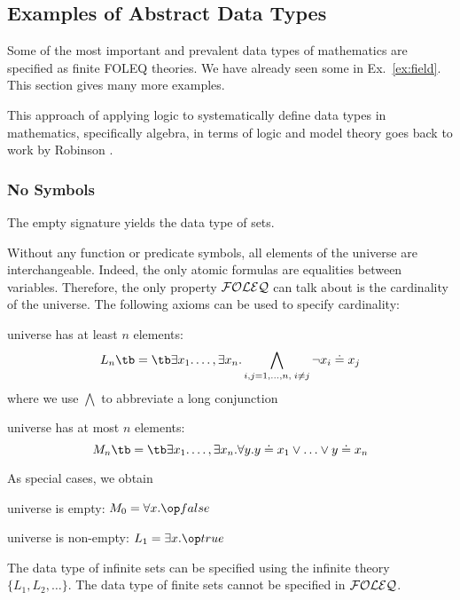 \subsection{Examples of Abstract Data Types}\label{sec:fol:adtexamples}

Some of the most important and prevalent data types of mathematics are specified as finite FOLEQ theories.
We have already seen some in Ex.~\ref{ex:field}.
This section gives many more examples.

This approach of applying logic to systematically define data types in mathematics, specifically algebra, in terms of logic and model theory goes back to work by Robinson \cite{robinsonmodeltheory}.

\subsubsection{No Symbols}

The empty signature yields the data type of sets.

Without any function or predicate symbols, all elements of the universe are interchangeable.
Indeed, the only atomic formulas are equalities between variables.
Therefore, the only property ${\mathcal{FOLEQ}}$ can talk about is the cardinality of the universe.
The following axioms can be used to specify cardinality:
\begin{compactitem}
\item universe has at least $n$ elements: \[L_n\tb=\tb\exists x_1.\ldots,\exists x_n.\bigwedge_{i,j=1,\ldots,n,\;i\neq j}\neg x_i\doteq x_j\]
where we use $\bigwedge$ to abbreviate a long conjunction
\item universe has at most $n$ elements: \[M_n\tb=\tb\exists x_1.\ldots,\exists x_n.\forall y.y\doteq x_1\vee\ldots\vee y\doteq x_n\]
\end{compactitem}
As special cases, we obtain
\begin{compactitem}
\item universe is empty: $M_0=\forall x.\false$
\item universe is non-empty: $L_1=\exists x.\true$
\end{compactitem}


The data type of infinite sets can be specified using the infinite theory $\{L_1,L_2,\ldots\}$.
The data type of finite sets cannot be specified in ${\mathcal{FOLEQ}}$.


